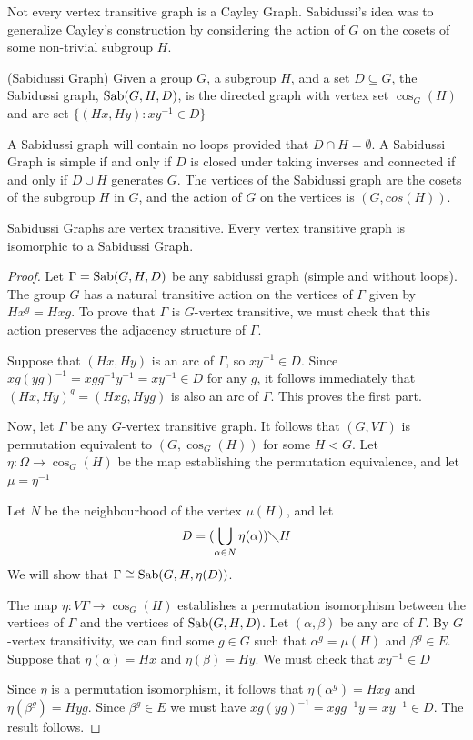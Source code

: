 Not every vertex transitive graph is a Cayley Graph.
Sabidussi's idea was to generalize Cayley's construction by considering the 
action of $G$ on the cosets of some non-trivial subgroup $H$.

\begin{definition} (Sabidussi Graph)
Given a group $G$, a subgroup $H$, and a set $D \subseteq G$, 
the Sabidussi graph, $\operatorname{Sab}(G,H,D)$, 
is the directed graph with vertex set $\cos_G(H)$ 
and arc set $\{(Hx,Hy) : xy^{-1} \in D\}$
\end{definition}

A Sabidussi graph will contain no loops
provided that $D \cap H = \emptyset$.
A Sabidussi Graph is simple if and only if
$D$ is closed under taking inverses
and connected if and only if $D \cup H$ generates $G$.
The vertices of the Sabidussi graph are  
the cosets of the subgroup $H$ in $G$,
and the action of $G$ on the vertices is $(G,cos(H))$.

\begin{proposition}[Sabidussi]
Sabidussi Graphs are vertex transitive.
Every vertex transitive graph is isomorphic to a Sabidussi Graph.
\begin{proof}
Let $\Gamma = \operatorname{Sab}(G,H,D)$ be any sabidussi graph
(simple and without loops).
The group $G$ has a natural transitive action on the vertices of $\Gamma$
given by $Hx^g = Hxg$.
To prove that $\Gamma$ is $G$-vertex transitive,
we must check that this action preserves the adjacency structure of $\Gamma$.

Suppose that $(Hx,Hy)$ is an arc of $\Gamma$,
so $xy^{-1} \in D$.
Since $xg(yg)^{-1} = xgg^{-1}y^{-1} = xy^{-1} \in D$
for any $g$, 
it follows immediately that $(Hx,Hy)^g = (Hxg,Hyg)$
is also an arc of $\Gamma$.
This proves the first part.

Now, let $\Gamma$ be any $G$-vertex transitive graph.
It follows that $(G, V \Gamma)$ is permutation
equivalent to $(G, \cos_G(H))$ for some $H < G$.
Let $\eta : \Omega \to \cos_G(H)$ be the map establishing
the permutation equivalence, and let $\mu = \eta^{-1}$

Let $N$ be the neighbourhood of the vertex $\mu(H)$, and let 
$$D = (\bigcup_{\alpha \in N} \eta(\alpha)) \diagdown H$$
We will show that $\Gamma \cong \operatorname{Sab}(G,H,\eta(D))$.

The map $\eta : V \Gamma \to \cos_G(H)$
establishes a permutation isomorphism between the
vertices of $\Gamma$ and the vertices of $\operatorname{Sab}(G,H,D)$.
Let $(\alpha, \beta)$ be any arc of $\Gamma$.
By $G$-vertex transitivity, we can find some $g \in G$
such that $\alpha^g = \mu(H)$ and $\beta^g \in E$.
Suppose that $\eta(\alpha) = Hx$ and $\eta(\beta) = Hy$.
We must check that $xy^{-1} \in D$

Since $\eta$ is a permutation isomorphism,
it follows that $\eta(\alpha^g) = Hxg$
and $\eta(\beta^g) = Hyg$.
Since $\beta^g \in E$ we must have 
$xg(yg)^{-1} = xgg^{-1}y = xy^{-1}\in D$.
The result follows.


\end{proof}

\end{proposition}

